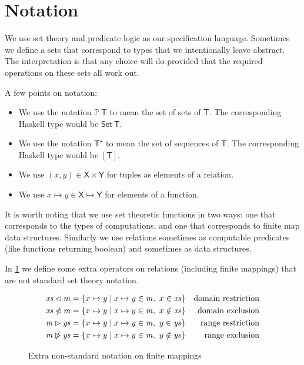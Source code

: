 \documentclass[11pt,a4paper]{article}
\newcommand{\powerset}[1]{\mathbb{P}~#1}
\newcommand{\sequencetype}[1]{#1^\star}
\newcommand{\restrictdom}{\lhd}
\newcommand{\subtractdom}{\mathbin{\slashed{\restrictdom}}}
\newcommand{\restrictrange}{\rhd}
\newcommand{\subtractrange}{\mathbin{\slashed{\restrictrange}}}
\newcommand{\var}[1]{\mathit{#1}}
\newcommand{\type}[1]{\mathsf{#1}}
\begin{document}
\section{Notation}

We use set theory and predicate logic as our specification language.
Sometimes we define a sets that correspond to types that we intentionally
leave abstract. The interpretation is that any choice will do provided that
the required operations on these sets all work out.

A few points on notation:
\begin{itemize}
\item We use the notation $\powerset{\type{T}}$ to mean the set of sets of
      $\type{T}$. The corresponding Haskell type would be
      $\type{Set} ~ \type{T}$.
\item We use the notation $\sequencetype{\type{T}}$ to mean the set of
      sequences of $\type{T}$. The corresponding Haskell type would
      be $[\type{T}]$.
\item We use $(x,y) \in \type{X} \times \type{Y}$ for tuples as elements of a
      relation.
\item We use $x \mapsto y \in \type{X} \mapsto \type{Y}$ for elements of a
      function.
\end{itemize}
%
It is worth noting that we use set theoretic functions in two ways: one
that corresponds to the types of computations, and one that corresponds to
finite map data structures. Similarly we use relations sometimes as computable
predicates (like functions returning boolean) and sometimes as data structures.

In \cref{fig:notation} we define some extra operators on relations (including
finite mappings) that are not standard set theory notation.

\begin{figure}
\begin{align*}
  \var{xs} \restrictdom \var{m}
& = \{ x \mapsto y \mid x \mapsto y \in \var{m}, ~ x \in \var{xs} \}
& \text{domain restriction}
\\
  \var{xs} \subtractdom \var{m}
& = \{ x \mapsto y \mid x \mapsto y \in \var{m}, ~ x \notin \var{xs} \}
& \text{domain exclusion}
\\
  \var{m} \restrictrange \var{ys}
& = \{ x \mapsto y \mid x \mapsto y \in \var{m}, ~ y \in \var{ys} \}
& \text{range restriction}
\\
  \var{m} \subtractrange \var{ys}
& = \{ x \mapsto y \mid x \mapsto y \in \var{m}, ~ y \notin \var{ys} \}
& \text{range exclusion}
\end{align*}
\caption{Extra non-standard notation on finite mappings}
\label{fig:notation}
\end{figure}
\end{document}
